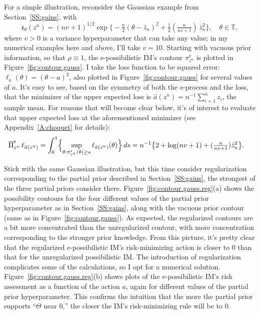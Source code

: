 \documentclass[a4paper, 12pt]{article}
\theoremstyle{plain}
\theoremstyle{definition}
\theoremstyle{remark}
\newcommand{\TT}{\mathbb{T}}
\newcommand{\uPi}{\overline{\Pi}}
\newcommand{\eval}{\mathfrak{e}}
\begin{document}
For a simple illustration, reconsider the Gaussian example from Section~\ref{SS:gains}, with  
\[ \eval_\theta(z^n) = (nv + 1)^{1/2} \exp\bigl\{ -\tfrac{n}{2} (\theta - \bar z_n)^2 + \tfrac12 ( \tfrac{n}{nv + 1} ) \, \bar z_n^2 \bigr\}, \quad \theta \in \TT, \]
where $v > 0$ is a variance hyperparameter that can take any value; in my numerical examples here and above, I'll take $v=10$.  Starting with vacuous prior information, so that $\rho \equiv 1$, the e-possibilistic IM's contour $\pi_{z^n}^\eval$ is plotted in Figure~\ref{fig:contour.gauss}.  I take the loss function to be squared error: $\ell_a(\theta) = (\theta-a)^2$, also plotted in Figure~\ref{fig:contour.gauss} for several values of $a$.  It's easy to see, based on the symmetry of both the e-process and the loss, that the minimizer of the upper expected loss is $\hat a(z^n) = n^{-1} \sum_{i=1}^n z_i$, the sample mean.  For reasons that will become clear below, it's of interest to evaluate that upper expected loss at the aforementioned minimizer (see Appendix~\ref{A:choquet} for details):
\begin{align*}
\uPi_{z^n}^{\eval} \, \ell_{\hat a(z^n)} & =  \int_0^1 \Bigl\{ \sup_{\theta: \pi_{z^n}^{\eval}(\theta) \geq s} \ell_{\hat a(z^n)}(\theta) \Bigr\} \, ds = n^{-1}\bigl\{ 2 + \log(nv + 1) + (\tfrac{n}{nv+1}) \bar z_n^2 \bigr\}.
\end{align*}

Stick with the same Gaussian illustration, but this time consider regularization corresponding to the partial prior described in Section~\ref{SS:gains}, the strongest of the three partial priors consider there.  Figure~\ref{fig:contour.gauss.reg}(a) shows the possibility contours for the four different values of the partial prior hyperparameter as in Section~\ref{SS:gains}, along with the vacuous prior contour (same as in Figure~\ref{fig:contour.gauss}).  As expected, the regularized contours are a bit more concentrated than the unregularized contour, with more concentration corresponding to the stronger prior knowledge.  From this picture, it's pretty clear that the regularized e-possibilistic IM's risk-minimizing action is closer to 0 than that for the unregularized possibilistic IM.  The introduction of regularization complicates some of the calculations, so I opt for a numerical solution.  Figure~\ref{fig:contour.gauss.reg}(b) shows plots of the e-possibilistic IM's risk assessment as a function of the action $a$, again for different values of the partial prior hyperparameter.  This confirms the intuition that the more the partial prior supports ``$\Theta$ near 0,'' the closer the IM's risk-minimizing rule will be to 0. 
\end{document}
